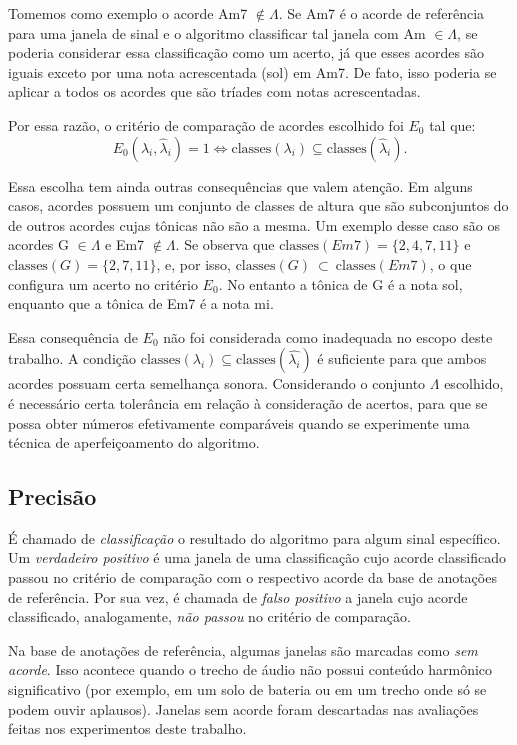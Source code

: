         Tomemos como exemplo o acorde Am7 $\notin \Lambda$. Se Am7 é o acorde de referência para uma janela de sinal e o algoritmo classificar tal janela com Am $\in \Lambda$, se poderia considerar essa classificação como um acerto, já que esses acordes são iguais exceto por uma nota acrescentada (sol) em Am7. De fato, isso poderia se aplicar a todos os acordes que são tríades com notas acrescentadas.
        
        Por essa razão, o critério de comparação de acordes escolhido foi $E_0$ tal que:
        \[
            E_0(\lambda_i, \hat{\lambda}_i) = 1 \Leftrightarrow \mbox{classes}(\lambda_i) \subseteq \mbox{classes}(\hat{\lambda}_i)\mbox{.}
        \]
        
        Essa escolha tem ainda outras consequências que valem atenção. Em alguns casos, acordes possuem um conjunto de classes de altura que são subconjuntos do de outros acordes cujas tônicas não são a mesma. Um exemplo desse caso são os acordes G $\in \Lambda$ e Em7 $\notin \Lambda$. Se observa que $\mbox{classes}(Em7) = \{ 2, 4, 7, 11 \}$ e $\mbox{classes}(G) = \{ 2, 7, 11 \}$, e, por isso, $\mbox{classes}(G)~\subset~\mbox{classes}(Em7)$, o que configura um acerto no critério $E_0$. No entanto a tônica de G é a nota sol, enquanto que a tônica de Em7 é a nota mi.
        
        Essa consequência de $E_0$ não foi considerada como inadequada no escopo deste trabalho. A condição $\mbox{classes}(\lambda_i) \subseteq \mbox{classes}(\hat{\lambda_i})$ é suficiente para que ambos acordes possuam certa semelhança sonora. Considerando o conjunto $\Lambda$ escolhido, é necessário certa tolerância em relação à consideração de acertos, para que se possa obter números efetivamente comparáveis quando se experimente uma técnica de aperfeiçoamento do algoritmo.
        
    
    \subsection{Precisão}
        É chamado de \textit{classificação} o resultado do algoritmo para algum sinal específico. Um \textit{verdadeiro positivo} é uma janela de uma classificação cujo acorde classificado passou no critério de comparação com o respectivo acorde da base de anotações de referência. Por sua vez, é chamada de \textit{falso positivo} a janela cujo acorde classificado, analogamente, \textit{não passou} no critério de comparação.
        
        Na base de anotações de referência, algumas janelas são marcadas como \textit{sem acorde}. Isso acontece quando o trecho de áudio não possui conteúdo harmônico significativo (por exemplo, em um solo de bateria ou em um trecho onde só se podem ouvir aplausos). Janelas sem acorde foram descartadas nas avaliações feitas nos experimentos deste trabalho.
        

